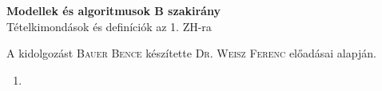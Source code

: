 \documentclass{article}
\begin{document}
\renewcommand{\labelitemi}{\textbullet}
\begin{center}
	{\Large\textbf{Modellek és algoritmusok B szakirány}}\\[0.2cm]	
	Tételkimondások és definíciók az 1. ZH-ra
\end{center}
{\small A kidolgozást \textsc{Bauer Bence} készítette \textsc{Dr. Weisz Ferenc} előadásai alapján.}

\begin{enumerate}
	\item 
\end{enumerate}
\end{document}
